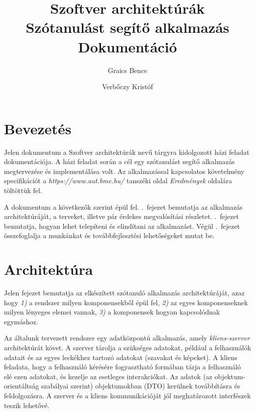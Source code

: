 \documentclass[11pt, a4paper]{article}
\begin{document}
\title{Szoftver architektúrák \\ Szótanulást segítő alkalmazás \\ \large{Dokumentáció}}
    \author{Graics Bence \and Verbőczy Kristóf}

    \maketitle
    
    \tableofcontents
    \newpage
    
    \section{Bevezetés}
    \label{sec:bevezetes}
    Jelen dokumentum a Szoftver architektúrák nevű tárgyra kidolgozott házi feladat dokumentációja. A házi feladat során a cél egy szótanulást segítő alkalmazás megtervezése és implementálása volt. Az alkalmazással kapcsolatos követelmény specifikációt a \textit{https://www.aut.bme.hu/} tanszéki oldal \textit{Eredmények} oldalára töltöttük fel.
    
    A dokumentum a következők szerint épül fel. .~fejezet bemutatja az alkalmazás architektúráját, a terveket, illetve pár érdekes megvalósítási részletet. .~fejezet bemutatja, hogyan lehet telepíteni és elindítani az alkalmazást. Végül .~fejezet összefoglalja a munkánkat és továbbfejlesztési lehetőségeket mutat be.
    
    \section{Architektúra}
    \label{sec:architektúra}
    Jelen fejezet bemutatja az elkészített szótanuló alkalmazás architektúráját, azaz hogy \textit{1)} a rendszer milyen komponensekből épül fel, \textit{2)} az egyes komponenseknek milyen lényeges elemei vannak, \textit{3)} a komponensek hogyan kapcsolódnak egymáshoz.
    
    Az általunk tervezett rendszer egy adatközpontú alkalmazás, amely \emph{kliens-szerver} architektúrát követ. A szerver tárolja a szükséges adatokat, például a felhasználók adatait és az egyes leckékhez tartozó adatokat (szavakat és képeket). A kliens feladata, hogy a felhasználó kérésére fogyasztható formában tárja a felhasználó elé ezen adatokat, és kezelje az esetleges interakciókat. Az adatok (az objektum-orientáltság szabályai szerint) objektumokban (DTO) kerülnek továbbításra és feldolgozásra. A szerver és a kliens kommunikációját jól meghatározott interfészek teszik lehetővé.
    
\end{document}
